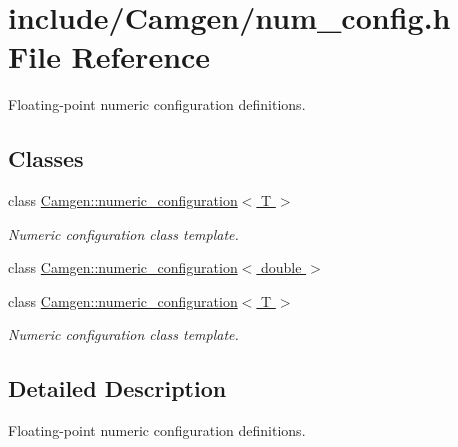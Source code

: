 \hypertarget{a00680}{\section{include/\-Camgen/num\-\_\-config.h File Reference}
\label{a00680}
}


Floating-\/point numeric configuration definitions.  


\subsection*{Classes}
\begin{DoxyCompactItemize}
\item 
class \hyperlink{a00382}{Camgen\-::numeric\-\_\-configuration$<$ T $>$}
\begin{DoxyCompactList}\small\item\em Numeric configuration class template. \end{DoxyCompactList}\item 
class \hyperlink{a00383}{Camgen\-::numeric\-\_\-configuration$<$ double $>$}
\item 
class \hyperlink{a00382}{Camgen\-::numeric\-\_\-configuration$<$ T $>$}
\begin{DoxyCompactList}\small\item\em Numeric configuration class template. \end{DoxyCompactList}\end{DoxyCompactItemize}


\subsection{Detailed Description}
Floating-\/point numeric configuration definitions. 